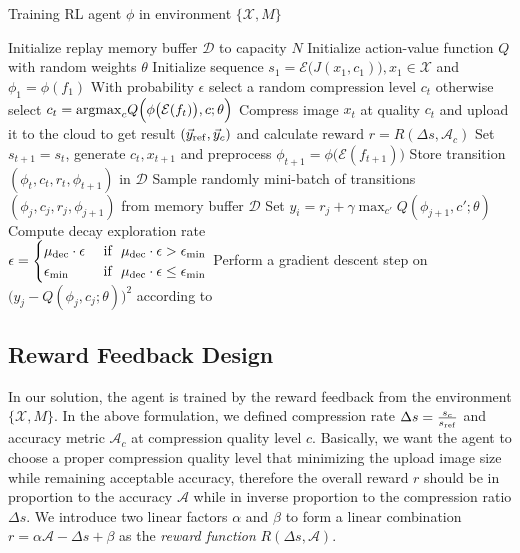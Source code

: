 \begin{algorithm}[htbp]
    \caption{Training RL agent $ \phi $ in environment $ \{\mathcal{X}, M\} $}
    \label{alg: rl-train}
    \begin{algorithmic}[1]
        \STATE Initialize replay memory buffer $ \mathcal{D} $ to capacity $ N $
        \STATE Initialize action-value function $ Q $ with random weights $ \theta $
        \STATE Initialize sequence $ s_1 = \mathcal{E}\big(J(x_1, c_1)\big), x_1 \in \mathcal{X} $ and $ \phi_1 = \phi(f_1) $
        \STATE With probability $ \epsilon $ select a random compression level $ c_t $ otherwise select $ c_t = {\rm argmax}_cQ\Big(\phi\big(\mathcal{E}(f_t)\big), c; \theta\Big) $
        \STATE Compress image $ x_t $ at quality $ c_t $ and upload it to the cloud to get result $ (\vec{y}_{\rm ref}, \vec{y}_c) $ and calculate reward $ r = R(\Delta s, \mathcal{A}_c) $
        \STATE Set $ s_{t+1} = s_t $, generate $ c_t, x_{t+1} $ and preprocess $ \phi_{t+1} = \phi \big(\mathcal{E}(f_{t+1})\big) $
        \STATE Store transition $ (\phi_t, c_t, r_t, \phi_{t+1}) $ in $ \mathcal{D} $
        \STATE Sample randomly mini-batch of transitions \\ $ (\phi_j, c_j, r_j, \phi_{j+1}) $ from memory buffer $ \mathcal{D} $
        \STATE Set $ y_i = r_j + \gamma \max_{c'}Q(\phi_{j+1}, c'; \theta) $
        \STATE Compute decay exploration rate \\
        $ \epsilon = 
        \begin{cases}
        \mu_{\rm dec}\cdot \epsilon & \text{ if } \ \mu_{\rm dec}\cdot \epsilon > \epsilon_{\min} \\ 
        \epsilon_{\min}             & \text{ if } \ \mu_{\rm dec}\cdot \epsilon \leq \epsilon_{\min}
        \end{cases} $
        \STATE Perform a gradient descent step on \\ $ \big(y_j - Q(\phi_j, c_j; \theta)\big)^2 $ according to~\cite{DQN}
        \ENDIF
        \ENDFOR
    \end{algorithmic}
\end{algorithm}

\subsection{Reward Feedback Design}

In our solution, the agent is trained by the reward feedback from the environment $ \{\mathcal{X}, M\} $. In the above formulation, we defined compression rate $ \Delta s = \frac{s_c}{s_{\rm ref}} $ and accuracy metric $ \mathcal{A}_c $ at compression quality level $ c $. Basically, we want the agent to choose a proper compression quality level that minimizing the upload image size while remaining acceptable accuracy, therefore the overall reward $ r $ should be in proportion to the accuracy $ \mathcal{A} $ while in inverse proportion to the compression ratio $ \Delta s $. We introduce two linear factors $ \alpha $ and $ \beta $ to form a linear combination $ r = \alpha \mathcal{A} - \Delta s + \beta $ as the \emph{reward function} $ R(\Delta s, \mathcal{A}) $. %

